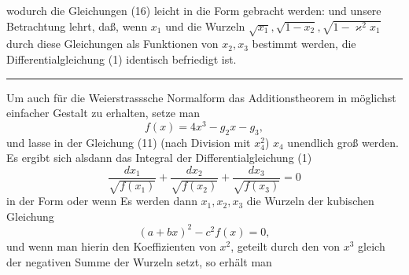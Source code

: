 wodurch die Gleichungen (16) leicht in die Form gebracht werden:
und unsere Betrachtung lehrt, daß, wenn $x_1$ und die Wurzeln
$\sqrt{x_1}, \sqrt{1-x_2}, \sqrt{1-\varkappa^2x_1}$ %
durch diese Gleichungen als Funktionen
von $x_2, x_3$ bestimmt werden, die Differentialgleichung (1) identisch
befriedigt ist.

\begin{center}\rule{2cm}{0.4pt}\end{center}

Um auch für die Weierstrasssche Normalform das Additionstheorem
 in möglichst einfacher Gestalt zu erhalten, setze man
\[ f(x) = 4x^3 - g_2x - g_3, \]
und lasse in der Gleichung (11) (nach Division mit $x_4^2$) $x_4$ unendlich
 groß werden. Es ergibt sich alsdann das Integral der
Differentialgleichung (1)
\[ \dfrac{dx_1}{\sqrt{f(x_1)}} + \dfrac{dx_2}{\sqrt{f(x_2)}} + \dfrac{dx_3}{\sqrt{f(x_3)}} = 0 \]
in der Form
oder
wenn
Es werden dann $x_1, x_2, x_3$ die Wurzeln der kubischen
Gleichung
\[ (a+bx)^2 - c^2f(x) = 0, \]
und wenn man hierin den Koeffizienten von $x^2$, geteilt durch
den von $x^3$ gleich der negativen Summe der Wurzeln setzt, so
erhält man

